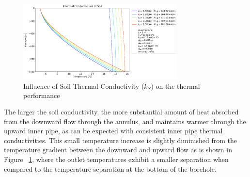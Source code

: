 	        \begin{figure}[h!]
	            \centering
	            \includegraphics[width=0.75\textwidth]{ks_1000.png}
	            \caption{Influence of Soil Thermal Conductivity ($k_S$) on the thermal performance}\label{fig:ks}
	            \label{fig:ks1000}
	        \end{figure}
			The larger the soil conductivity, the more substantial amount of heat absorbed from the downward flow through the annulus, and maintains warmer through the upward inner pipe, as can be expected with consistent inner pipe thermal conductivities. This small temperature increase is slightly diminished from the temperature gradient between the downward and upward flow as is shown in Figure ~\ref{fig:ks1000}, where the outlet temperatures exhibit a smaller separation when compared to the temperature separation at the bottom of the borehole.
